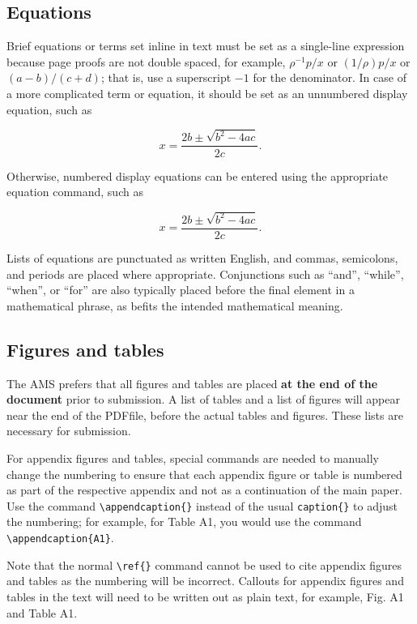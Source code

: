 \documentclass[draft]{ametsoc}
\begin{document}
\subsection{Equations}\label{equations}

Brief equations or terms set inline in text must be set as a single-line
expression because page proofs are not double spaced, for example,
\(\rho^{-1}p/x\) or \((1/{\rho})p/x\) or \((a-b)/(c+d)\); that is, use a
superscript \(-1\) for the denominator. In case of a more complicated
term or equation, it should be set as an unnumbered display equation,
such as

\[
x=\frac{2b\pm\sqrt{b^{2}-4ac}}{2c}.
\]

Otherwise, numbered display equations can be entered using the
appropriate equation command, such as

\begin{equation}
x=\frac{2b\pm\sqrt{b^{2}-4ac}}{2c}.  
\end{equation}

Lists of equations are punctuated as written English, and commas,
semicolons, and periods are placed where appropriate. Conjunctions such
as ``and'', ``while'', ``when'', or ``for'' are also typically placed
before the final element in a mathematical phrase, as befits the
intended mathematical meaning.

\subsection{Figures and tables}\label{figures-and-tables}

The AMS prefers that all figures and tables are placed \textbf{at the
end of the document} prior to submission. A list of tables and a list of
figures will appear near the end of the PDFfile, before the actual
tables and figures. These lists are necessary for submission.

For appendix figures and tables, special commands are needed to manually
change the numbering to ensure that each appendix figure or table is
numbered as part of the respective appendix and not as a continuation of
the main paper. Use the command
\texttt{\textbackslash{}appendcaption\{\}} instead of the usual
\texttt{caption\{\}} to adjust the numbering; for example, for Table A1,
you would use the command \texttt{\textbackslash{}appendcaption\{A1\}}.

Note that the normal \texttt{\textbackslash{}ref\{\}} command cannot be
used to cite appendix figures and tables as the numbering will be
incorrect. Callouts for appendix figures and tables in the text will
need to be written out as plain text, for example, Fig. A1 and Table A1.
\end{document}
